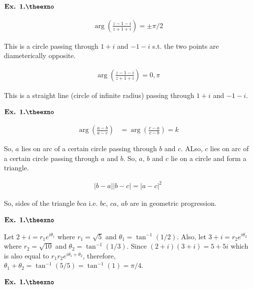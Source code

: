 \documentclass{article}
\newcounter{exno}
\begin{document}
\vspace{0.2in}

${\textbf{Ex. 1.\theexno}}$
\addtocounter{exno}{1}

\begin{align*}
    \arg\left(\frac{z-1-i}{z+1+i}\right) = \pm \pi/2
\end{align*}

This is a circle passing through $1+i$ and $-1-i$ s.t. the two points are diameterically opposite.

\begin{align*}
    \arg\left(\frac{z-1-i}{z+1+i}\right) = 0, \pi
\end{align*}

This is a straight line (circle of infinite radius) passing through $1+i$ and $-1-i$.

\vspace{0.2in}

${\textbf{Ex. 1.\theexno}}$
\addtocounter{exno}{1}

\begin{align*}
    \arg \left(\frac{a-b}{a-c}\right) &= \arg\left(\frac{c-a}{c-b}\right) = k
\end{align*}

So, $a$ lies on arc of a certain circle passing through $b$ and $c$. ALso, $c$ lies on arc of a certain circle passing through $a$ and $b$. So, $a$, $b$ and $c$ lie on a circle and form a triangle.

\begin{align*}
    |b-a||b-c| = |a-c|^2
\end{align*}

So, sides of the triangle $bca$ i.e. $bc$, $ca$, $ab$ are in geometric progression.

\vspace{0.2in}

${\textbf{Ex. 1.\theexno}}$
\addtocounter{exno}{1}

Let $2+i = r_1e^{i\theta_1}$ where $r_1=\sqrt{5}$ and $\theta_1 = \tan^{-1}(1/2)$. Also, let $3+i=r_2e^{i\theta_2}$ where $r_2 = \sqrt{10}$ and $\theta_2 = \tan^{-1}(1/3)$. Since $(2+i)(3+i) = 5 + 5i$ which is also equal to $r_1r_2e^{i\theta_1+\theta_2}$, therefore, $\theta_1+\theta_2 = \tan^{-1}(5/5) = \tan^{-1}(1)=\pi/4$.

\vspace{0.2in}

${\textbf{Ex. 1.\theexno}}$
\addtocounter{exno}{1}
\end{document}
